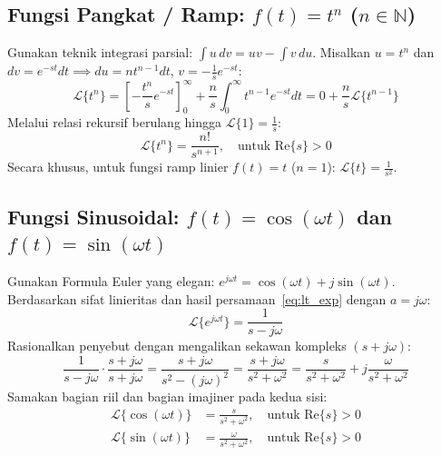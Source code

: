 \documentclass[11pt,a4paper]{article}
\theoremstyle{definition}
\begin{document}
\subsection{Fungsi Pangkat / Ramp: \texorpdfstring{$f(t) = t^n$}{f(t) = t\textasciicircum n} (\texorpdfstring{$n \in \mathbb{N}$}{n in N})}
Gunakan teknik integrasi parsial: $\int u \, dv = u v - \int v \, du$. Misalkan $u = t^n$ dan $dv = e^{-st} dt \implies du = n t^{n-1} dt$, $v = -\frac{1}{s} e^{-st}$:
\begin{equation*}
    \mathcal{L}\{t^n\} = \left[ -\frac{t^n}{s} e^{-st} \right]_0^\infty + \frac{n}{s} \int_0^\infty t^{n-1} e^{-st} dt = 0 + \frac{n}{s} \mathcal{L}\{t^{n-1}\}
\end{equation*}
Melalui relasi rekursif berulang hingga $\mathcal{L}\{1\} = \frac{1}{s}$:
\begin{equation}
    \mathcal{L}\{t^n\} = \frac{n!}{s^{n+1}}, \quad \text{untuk } \text{Re}\{s\} > 0
    \label{eq:lt_power}
\end{equation}
Secara khusus, untuk fungsi ramp linier $f(t) = t$ ($n=1$): $\mathcal{L}\{t\} = \frac{1}{s^2}$.

\subsection{Fungsi Sinusoidal: \texorpdfstring{$f(t) = \cos(\omega t)$}{f(t) = cos(omega t)} dan \texorpdfstring{$f(t) = \sin(\omega t)$}{f(t) = sin(omega t)}}
Gunakan Formula Euler yang elegan: $e^{j\omega t} = \cos(\omega t) + j \sin(\omega t)$.
Berdasarkan sifat linieritas dan hasil persamaan~\eqref{eq:lt_exp} dengan $a = j\omega$:
\begin{equation*}
    \mathcal{L}\{e^{j\omega t}\} = \frac{1}{s - j\omega}
\end{equation*}
Rasionalkan penyebut dengan mengalikan sekawan kompleks $(s + j\omega)$:
\begin{equation*}
    \frac{1}{s - j\omega} \cdot \frac{s + j\omega}{s + j\omega} = \frac{s + j\omega}{s^2 - (j\omega)^2} = \frac{s + j\omega}{s^2 + \omega^2} = \frac{s}{s^2 + \omega^2} + j \frac{\omega}{s^2 + \omega^2}
\end{equation*}
Samakan bagian riil dan bagian imajiner pada kedua sisi:
\begin{align}
    \mathcal{L}\{\cos(\omega t)\} &= \frac{s}{s^2 + \omega^2}, \quad \text{untuk } \text{Re}\{s\} > 0 \label{eq:lt_cos} \\
    \mathcal{L}\{\sin(\omega t)\} &= \frac{\omega}{s^2 + \omega^2}, \quad \text{untuk } \text{Re}\{s\} > 0 \label{eq:lt_sin}
\end{align}
\end{document}
